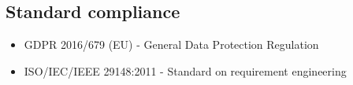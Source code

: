 \documentclass[../../../RASD.tex]{subfiles}
\begin{document}
\subsection{Standard compliance\label{sect:3.4.1}}
\begin{itemize}
	\item GDPR 2016/679 (EU) - General Data Protection Regulation
	\item ISO/IEC/IEEE 29148:2011 - Standard on requirement engineering
\end{itemize}
\end{document}
